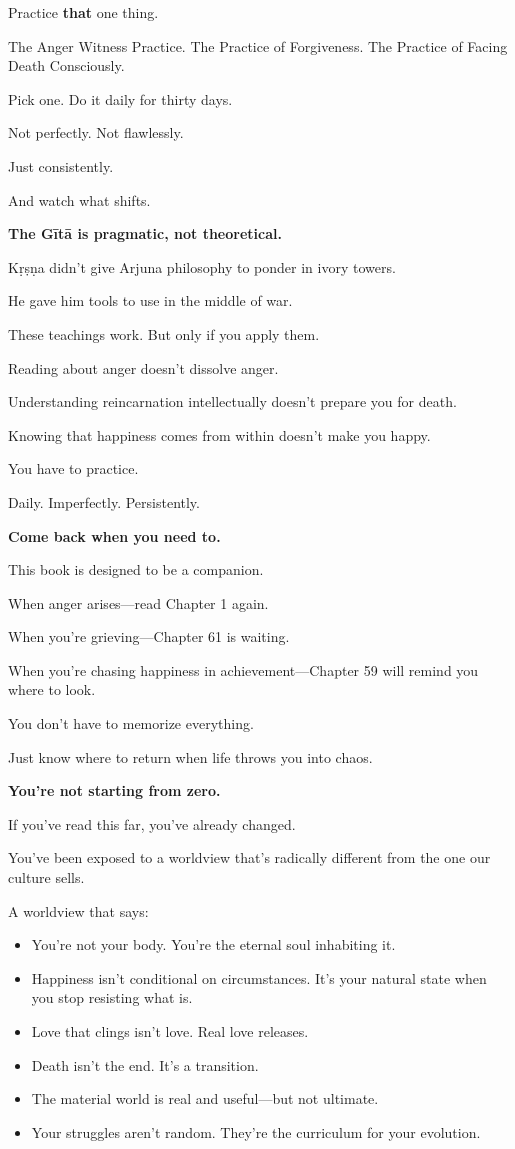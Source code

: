 \documentclass[11pt,twoside]{book}
\begin{document}
Practice \textbf{that} one thing.

The Anger Witness Practice. The Practice of Forgiveness. The Practice of Facing Death Consciously.

Pick one. Do it daily for thirty days.

Not perfectly. Not flawlessly.

Just consistently.

And watch what shifts.

\textbf{\textbf{The Gītā is pragmatic, not theoretical.}}

Kṛṣṇa didn't give Arjuna philosophy to ponder in ivory towers.

He gave him tools to use in the middle of war.

These teachings work. But only if you apply them.

Reading about anger doesn't dissolve anger.

Understanding reincarnation intellectually doesn't prepare you for death.

Knowing that happiness comes from within doesn't make you happy.

You have to practice.

Daily. Imperfectly. Persistently.

\textbf{\textbf{Come back when you need to.}}

This book is designed to be a companion.

When anger arises—read Chapter 1 again.

When you're grieving—Chapter 61 is waiting.

When you're chasing happiness in achievement—Chapter 59 will remind you where to look.

You don't have to memorize everything.

Just know where to return when life throws you into chaos.

\textbf{\textbf{You're not starting from zero.}}

If you've read this far, you've already changed.

You've been exposed to a worldview that's radically different from the one our culture sells.

A worldview that says:

\begin{itemize}
\item You're not your body. You're the eternal soul inhabiting it.
\item Happiness isn't conditional on circumstances. It's your natural state when you stop resisting what is.
\item Love that clings isn't love. Real love releases.
\item Death isn't the end. It's a transition.
\item The material world is real and useful—but not ultimate.
\item Your struggles aren't random. They're the curriculum for your evolution.
\end{itemize}
\end{document}
